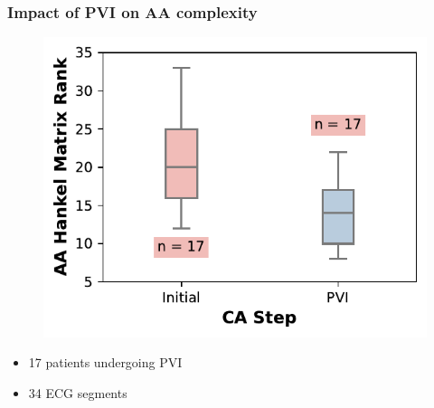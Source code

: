 \documentclass{beamer}
\begin{document}
	\begin{frame}
		\frametitle{Impact of PVI on AA complexity}

		\vspace{-0.5cm}
		\begin{figure}[h]
			\centering
			\includegraphics[scale=0.9]{boxplot_PVI.pdf}
		\end{figure}
		\vspace{-0.5cm}
		\begin{itemize}
			\item 17 patients undergoing PVI
			\item 34 ECG segments
		\end{itemize}
	\end{frame}
\end{document}
